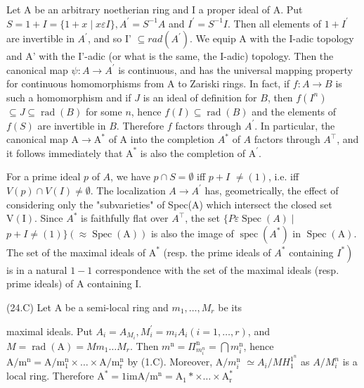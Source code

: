 Let A be an arbitrary noetherian ring and I a proper ideal of A. Put $S=1+I=\{1+x \mid x \varepsilon I\}, A^{\prime}=S^{-1} A$ and $I^{\prime}=S^{-1} I$. Then all elements of $1+I^{\prime}$ are invertible in $A^{\prime}$, and so I' $\subseteq r a d\left(A^{\prime}\right)$. We equip A with the I-adic topology and A' with the I'-adic (or what is the same, the I-adic) topology. Then the canonical map $\psi: A \rightarrow A^{\prime}$ is continuous, and has the universal mapping property for continuous homomorphisms from A to Zariski rings. In fact, if $f: A \rightarrow B$ is such a homomorphism and if $J$ is an ideal of definition for $B$, then $f\left(I^{n}\right)$ $\subseteq J \subseteq \operatorname{rad}(B)$ for some $n$, hence $f(I) \subseteq \operatorname{rad}(B)$ and the elements of $f(S)$ are invertible in $B$. Therefore $f$ factors through $A^{\prime}$. In particular, the canonical map $\mathrm{A} \rightarrow \mathrm{A}^{*}$ of $\mathrm{A}$ into the completion $A^{*}$ of $A$ factors through $A^{\top}$, and it follows immediately that $\mathrm{A}^{*}$ is also the completion of $\mathrm{A}^{\prime}$.

For a prime ideal $p$ of $A$, we have $p \cap S=\emptyset$ iff $p+I$ $\neq(1)$, i.e. iff $V(p) \cap V(I) \neq \emptyset$. The localization $A \rightarrow A^{\prime}$ has, geometrically, the effect of considering only the "subvarieties" of Spec(A) which intersect the closed set $\mathrm{V}(\mathrm{I})$. Since $A^{*}$ is faithfully flat over $A^{\top}$, the set $\{P \varepsilon \operatorname{Spec}(A) \mid$ $p+I \neq(1)\}(\approx \operatorname{Spec}(\mathrm{A}))$ is also the image of $\operatorname{spec}\left(A^{*}\right)$ in $\operatorname{Spec}(\mathrm{A})$. The set of the maximal ideals of $\mathrm{A}^{*}$ (resp. the prime ideals of $A^{*}$ containing $\left.I^{*}\right)$ is in a natural $1-1$ correspondence with the set of the maximal ideals (resp. prime ideals) of A containing I.

(24.C) Let A be a semi-local ring and $m_{1}, \ldots, M_{r}$ be its

maximal ideals. Put $A_{i}=A_{M_{i}}, M_{i}^{\prime}=m_{i} A_{i}(i=1, \ldots, r)$, and $M=\operatorname{rad}(\mathrm{A})=M m_{1} \ldots M_{r}$. Then $m^{\mathrm{n}}=\Pi_{m_{i}^{n}}^{\mathrm{n}}=\bigcap m_{i}^{\mathrm{n}}$, hence $\mathrm{A} / \mathrm{m}^{\mathrm{n}}=\mathrm{A} / \mathrm{m}_{1}^{\mathrm{n}} \times \ldots \times \mathrm{A} / \mathrm{m}_{\mathrm{r}}^{\mathrm{n}}$ by (1.C). Moreover, $\mathrm{A} / m_{i}^{\mathrm{n}}$ $\simeq A_{i} / M H_{1}^{1^{n}}$ as $A / M_{i}^{n}$ is a local ring. Therefore $\mathrm{A}^{*}=1 \mathrm{im} \mathrm{A} / \mathrm{m}^{\mathrm{n}}=\mathrm{A}_{1} * \times \ldots \times \mathrm{A}_{\mathrm{r}}^{*}$

